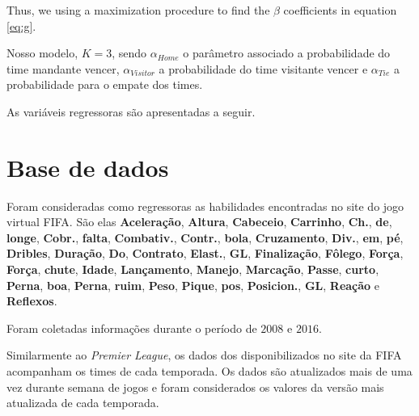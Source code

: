 \documentclass[doc,apacite,oneside,a4paper,12pt]{apa6}
\begin{document}
Thus, we using a maximization procedure to find the $\beta$ coefficients in equation \ref{eq:g}.

Nosso modelo, $K=3$, sendo $\alpha_{Home}$ o parâmetro associado a probabilidade do time mandante vencer, $\alpha_{Visitor}$ a probabilidade do time visitante vencer e $\alpha_{Tie}$ a probabilidade para o empate dos times.

As variáveis regressoras são apresentadas a seguir. 

\section{Base de dados}
\label{sec:data}


Foram consideradas como regressoras as habilidades encontradas no site do jogo virtual FIFA. São elas \textbf{Aceleração},  \textbf{Altura},  \textbf{Cabeceio},  \textbf{Carrinho},  \textbf{Ch.},  \textbf{de},  \textbf{longe},  \textbf{Cobr.},  \textbf{falta},  \textbf{Combativ.},  \textbf{Contr.},  \textbf{bola},  \textbf{Cruzamento},  \textbf{Div.},  \textbf{em},  \textbf{pé},  \textbf{Dribles},  \textbf{Duração},  \textbf{Do},  \textbf{Contrato},  \textbf{Elast.},  \textbf{GL},  \textbf{Finalização},  \textbf{Fôlego},  \textbf{Força},  \textbf{Força},  \textbf{chute},  \textbf{Idade},  \textbf{Lançamento},  \textbf{Manejo},  \textbf{Marcação},  \textbf{Passe},  \textbf{curto},  \textbf{Perna},  \textbf{boa},  \textbf{Perna},  \textbf{ruim},  \textbf{Peso},  \textbf{Pique},  \textbf{pos},  \textbf{Posicion.},  \textbf{GL},  \textbf{Reação} e  \textbf{Reflexos}.

Foram coletadas informações durante o período de $2008$ e $2016$.


Similarmente ao \textit{Premier League}, os dados dos disponibilizados no site da FIFA acompanham os times de cada temporada. Os dados são atualizados mais de uma vez durante semana de jogos e foram considerados os valores da versão mais atualizada de cada temporada.
\end{document}
